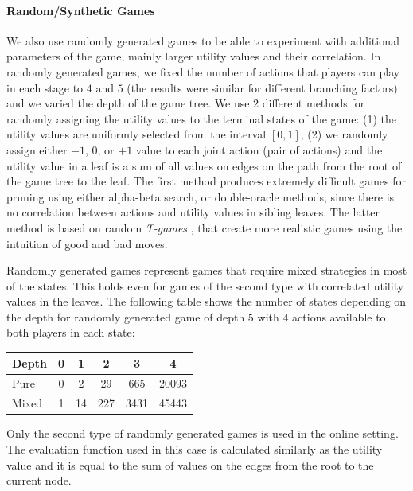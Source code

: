 \paragraph{\textbf{Random/Synthetic Games}}
We also use randomly generated games to be able to experiment with additional parameters of the game, mainly larger utility values and their correlation.
In randomly generated games, we fixed the number of actions that players can play in each stage to $4$ and $5$ (the results were similar for different branching factors) and we varied the depth of the game tree. 
We use $2$ different methods for randomly assigning the utility values to the terminal states of the game: 
(1) the utility values are uniformly selected from the interval $\left[0,1\right]$; 
(2) we randomly assign either $-1$, $0$, or $+1$ value to each joint action (pair of actions) and the utility value in a leaf is a sum of all values on edges on the path from the root of the game tree to the leaf. 
The first method produces extremely difficult games for pruning using either alpha-beta search, or double-oracle methods, since there is no correlation between actions and utility values in sibling leaves. 
The latter method is based on random \emph{T-games} \cite{smith1995}, that create more realistic games using the intuition of good and bad moves.

Randomly generated games represent games that require mixed strategies in most of the states. 
This holds even for games of the second type with correlated utility values in the leaves.
The following table shows the number of states depending on the depth for randomly generated game of depth $5$ with $4$ actions available to both players in each state:

\begin{table}[h!]
\centering
\small
\begin{tabular}{|l|c|c|c|c|c|}
\hline Depth & 0 & 1 & 2 & 3 & 4 \\
\hline Pure  & 0 & 2 & 29 & 665 & 20093 \\
\hline Mixed & 1 & 14 & 227 & 3431 & 45443 \\
\hline
\end{tabular}
\end{table}
\vspace{1.5cm}
Only the second type of randomly generated games is used in the online setting. 
The evaluation function used in this case is calculated similarly as the utility value and it is equal to the sum of values on the edges from the root to the current node.

